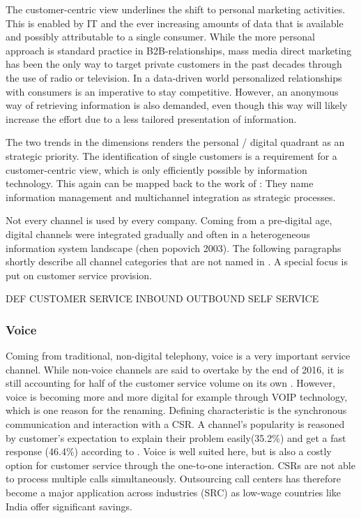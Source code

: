 		The customer-centric view underlines the shift to personal marketing activities. This is enabled by IT and the ever increasing amounts of data that is available and possibly attributable to a single consumer. While the more personal approach is standard practice in B2B-relationships, mass media direct marketing has been the only way to target private customers in the past decades through the use of radio or television. In a data-driven world personalized relationships with consumers is an imperative to stay competitive. However, an anonymous way of retrieving information is also demanded, even though this way will likely increase the effort due to a less tailored presentation of information. 
		
		The two trends in the dimensions renders the personal / digital quadrant as an strategic priority.
		The identification of single customers is a requirement for a customer-centric view, which is only efficiently possible by information technology.  
		This again can be mapped back to the work of \citeauthor{paynefrow2005}: They name information management and multichannel integration as strategic processes. 
		
		Not every channel is used by every company. Coming from a pre-digital age, digital channels were integrated gradually and often in a heterogeneous information system landscape (chen popovich 2003). The following paragraphs shortly describe all channel categories that are not named  in  \citeauthor{paynefrow2005}. A special focus is put on customer service provision. 
		
		DEF CUSTOMER SERVICE
		INBOUND
		OUTBOUND
		SELF SERVICE
		
		
		\subsubsection{Voice}
		
		Coming from traditional, non-digital telephony, voice is a very important service channel. While non-voice channels are said to overtake by the end of 2016, it is still accounting for half of the customer service volume on its own \cite{dimensiondata2016}. However, voice is becoming more and more digital for example through \acrfull{VOIP} technology, which is one reason for the renaming. Defining characteristic is the synchronous communication and interaction with a \acrfull{CSR}. A channel's popularity is reasoned by customer's expectation to explain their problem easily(35.2\%) and get a fast response (46.4\%) according to \cite{ocm2015}. Voice is well suited here, but is also a costly option for customer service through the one-to-one interaction. \acrshort{CSR}s are not able to process multiple calls simultaneously. Outsourcing call centers has therefore become a major application across industries (SRC) as low-wage countries like India offer significant savings. 
		
